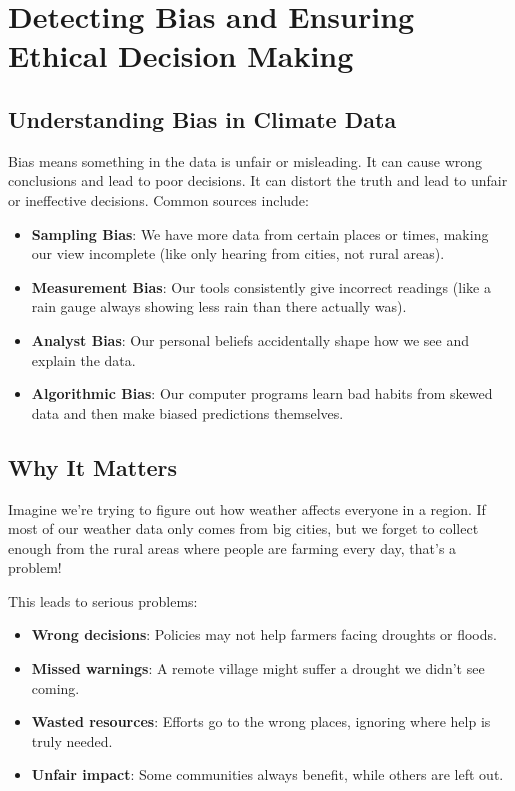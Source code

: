 \section{Detecting Bias and Ensuring Ethical Decision Making}

\subsection*{Understanding Bias in Climate Data}

Bias means something in the data is unfair or misleading. It can cause wrong conclusions and lead to poor decisions. It can distort the truth and lead to unfair or ineffective decisions. Common sources include:

\begin{itemize}
    \item \textbf{Sampling Bias}: We have more data from certain places or times, making our view incomplete (like only hearing from cities, not rural areas).
    \item \textbf{Measurement Bias}: Our tools consistently give incorrect readings (like a rain gauge always showing less rain than there actually was).
    \item \textbf{Analyst Bias}: Our personal beliefs accidentally shape how we see and explain the data.
    \item \textbf{Algorithmic Bias}: Our computer programs learn bad habits from skewed data and then make biased predictions themselves.
\end{itemize}

\subsection*{Why It Matters}
Imagine we're trying to figure out how weather affects everyone in a region. If most of our weather data only comes from big cities, but we forget to collect enough from the rural areas where people are farming every day, that's a problem!

This leads to serious problems:

\begin{itemize}
    \item \textbf{Wrong decisions}: Policies may not help farmers facing droughts or floods.
    \item \textbf{Missed warnings}: A remote village might suffer a drought we didn’t see coming.
    \item \textbf{Wasted resources}: Efforts go to the wrong places, ignoring where help is truly needed.
    \item \textbf{Unfair impact}: Some communities always benefit, while others are left out.
\end{itemize}


